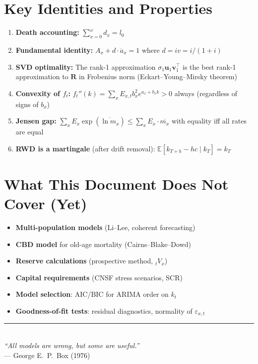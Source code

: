 \documentclass[11pt,a4paper]{article}
\theoremstyle{definition}
\newcommand{\E}{\mathbb{E}}
\begin{document}
\section{Key Identities and Properties}
\label{sec:identities}

\begin{enumerate}[label=\textbf{P\arabic*.}]
  \item \textbf{Death accounting:} $\sum_{x=0}^{\omega} d_x = l_0$
  \item \textbf{Fundamental identity:} $A_x + d \cdot \ddot{a}_x = 1$
    where $d = iv = i/(1+i)$
  \item \textbf{SVD optimality:} The rank-1 approximation $\sigma_1 \bm{u}_1 \bm{v}_1^\top$
    is the best rank-1 approximation to $\bm{R}$ in Frobenius norm
    (Eckart--Young--Mirsky theorem)
  \item \textbf{Convexity of $f_t$:} $f_t''(k) = \sum_x E_{x,t} b_x^2 e^{a_x + b_x k} > 0$
    always (regardless of signs of $b_x$)
  \item \textbf{Jensen gap:} $\sum_x E_x \exp(\overline{\ln m_x}) \leq \sum_x E_x \cdot \overline{m_x}$
    with equality iff all rates are equal
  \item \textbf{RWD is a martingale} (after drift removal):
    $\E[k_{T+h} - hc \mid k_T] = k_T$
\end{enumerate}

\section{What This Document Does Not Cover (Yet)}

\begin{itemize}
  \item \textbf{Multi-population models} (Li--Lee, coherent forecasting)
  \item \textbf{CBD model} for old-age mortality (Cairns--Blake--Dowd)
  \item \textbf{Reserve calculations} (prospective method, ${}_{t}V_x$)
  \item \textbf{Capital requirements} (CNSF stress scenarios, SCR)
  \item \textbf{Model selection}: AIC/BIC for ARIMA order on $k_t$
  \item \textbf{Goodness-of-fit tests}: residual diagnostics, normality of $\varepsilon_{x,t}$
\end{itemize}

\vfill

\begin{center}
\rule{0.5\textwidth}{0.4pt} \\[0.5em]
\textit{``All models are wrong, but some are useful.''} \\
--- George E.\ P.\ Box (1976)
\end{center}
\end{document}
